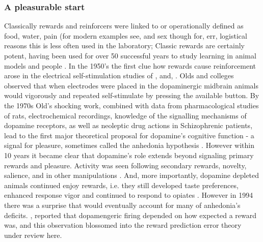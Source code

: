 \documentclass[doc,12pt]{apa}        %
\begin{document}
\subsubsection{A pleasurable start} %
\label{subsub:start}
Classically rewards and reinforcers were linked to or operationally defined as food, water, pain (for modern examples see,  and sex though for, err, logistical reasons this is less often used in the laboratory; Classic rewards are certainly potent, having been used for over 50 successful years to study learning in animal models \cite{iversen:2007aa} and people \cite{Kim:2010p7248,Montague:2006mz}.  In the 1950's the first clue how rewards cause reinforcement arose in the electrical self-stimulation studies of , and, .  Olds and colleges observed that when electrodes were placed in the dopaminergic midbrain animals would vigorously and repeated self-stimulate by pressing the available button.  By the 1970s Old's shocking work, combined with data from pharmacological studies of rats, electrochemical recordings, knowledge of the signalling mechanisms of dopamine receptors, as well as neoleptic drug actions in Schizophrenic patients, lead to the first major theoretical proposal for dopamine's cognitive function - a signal for pleasure, sometimes called the anhedonia hypothesis \cite{Wise:1978p8771}.  However within 10 years it became clear that dopamine's role extends beyond signaling primary rewards and pleasure. Activity was seen following secondary rewards, novelty, salience, and in other manipulations \cite{Spanagel:1999p8515, Salamone:2005p8774, BrombergMartin:2010p8834}.  And, more importantly, dopamine depleted animals continued enjoy rewards, i.e. they still developed taste preferences, enhanced response vigor \cite{Cannon:2003p8513} and continued to respond to opiates \cite{Hnasko:2005p8832}.  However in 1994 there was a surprise that would eventually account for many of anhedonia's deficits.  , reported that dopamengeric firing depended on how expected a reward was, and this observation blossomed into the reward prediction error theory under review here.
\end{document}

